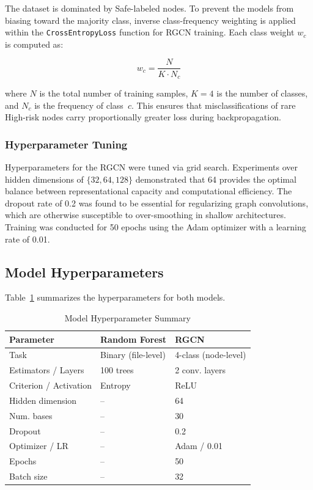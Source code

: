 \documentclass[conference]{IEEEtran}
\begin{document}
The dataset is dominated by Safe-labeled nodes. To prevent the models from biasing toward the majority class, inverse class-frequency weighting is applied within the \texttt{CrossEntropyLoss} function for RGCN training. Each class weight $w_c$ is computed as:

\begin{equation}
w_c = \frac{N}{K \cdot N_c}
\label{eq:classweight}
\end{equation}

where $N$ is the total number of training samples, $K = 4$ is the number of classes, and $N_c$ is the frequency of class~$c$. This ensures that misclassifications of rare High-risk nodes carry proportionally greater loss during backpropagation.

\subsubsection{Hyperparameter Tuning}

Hyperparameters for the RGCN were tuned via grid search. Experiments over hidden dimensions of $\{32, 64, 128\}$ demonstrated that 64 provides the optimal balance between representational capacity and computational efficiency. The dropout rate of 0.2 was found to be essential for regularizing graph convolutions, which are otherwise susceptible to over-smoothing in shallow architectures. Training was conducted for 50 epochs using the Adam optimizer with a learning rate of 0.01.

\subsection{Model Hyperparameters}

Table~\ref{tab:hyperparams} summarizes the hyperparameters for both models.

\begin{table}[htbp]
\caption{Model Hyperparameter Summary}
\label{tab:hyperparams}
\centering
\begin{tabular}{lll}
\toprule
\textbf{Parameter} & \textbf{Random Forest} & \textbf{RGCN} \\
\midrule
Task & Binary (file-level) & 4-class (node-level) \\
Estimators / Layers & 100 trees & 2 conv. layers \\
Criterion / Activation & Entropy & ReLU \\
Hidden dimension & -- & 64 \\
Num. bases & -- & 30 \\
Dropout & -- & 0.2 \\
Optimizer / LR & -- & Adam / 0.01 \\
Epochs & -- & 50 \\
Batch size & -- & 32 \\
\bottomrule
\end{tabular}
\end{table}
\end{document}
